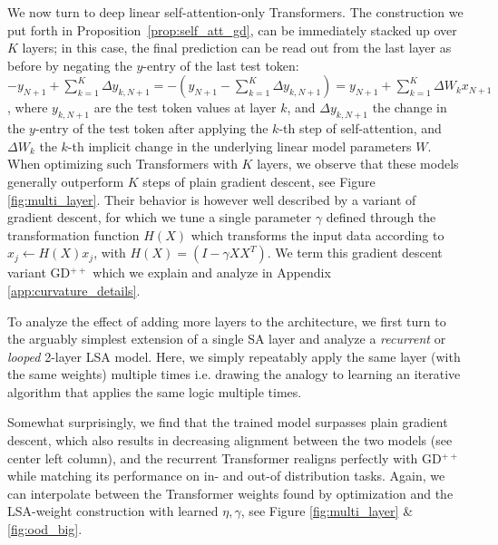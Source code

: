 \documentclass{article}
\theoremstyle{plain}
\theoremstyle{definition}
\theoremstyle{remark}
\begin{document}
We now turn to deep linear self-attention-only Transformers. The construction we put forth in Proposition~\ref{prop:self_att_gd}, can be immediately stacked up over $K$ layers; in this case, the final prediction can be read out from the last layer as before by negating the $y$-entry of the last test token: $-y_{N+1} + \sum_{k=1}^K \Delta y_{k,N+1}= - (y_{N+1} - \sum_{k=1}^K \Delta y_{k,N+1}) = y_{N+1} + \sum_{k=1}^K \Delta W_k x_{N+1}$, where $y_{k,N+1}$ are the test token values at layer $k$, and $\Delta y_{k,N+1}$ the change in the $y$-entry of the test token after applying the $k$-th step of self-attention, and $\Delta W_k$ the $k$-th implicit change in the underlying linear model parameters $W$. When optimizing such Transformers with $K$ layers, we observe that these models generally outperform $K$ steps of plain gradient descent, see Figure \ref{fig:multi_layer}. Their behavior is however well described by a variant of gradient descent, for which we tune a single parameter $\gamma$ defined through  the transformation function $H(X)$ which transforms the input data according to $x_j \leftarrow H(X) x_j$, with $H(X) = (I - \gamma XX^T)$. We term this gradient descent variant GD$^{++}$ which we explain and analyze in Appendix \ref{app:curvature_details}.

To analyze the effect of adding more layers to the architecture, we first turn to the arguably simplest extension of a single SA layer and analyze a \textit{recurrent} or \textit{looped} 2-layer LSA model. Here, we simply repeatably apply the same layer (with the same weights) multiple times i.e. drawing the analogy to learning an iterative algorithm that applies the same logic multiple times. 

Somewhat surprisingly, we find that the trained model surpasses plain gradient descent, which also results in decreasing alignment between the two models (see center left column), and the recurrent Transformer realigns perfectly with GD$^{++}$ while matching its performance on in- and out-of distribution tasks. Again, we can interpolate between the Transformer weights found by optimization and the LSA-weight construction with learned $\eta, \gamma$, see Figure \ref{fig:multi_layer} \& \ref{fig:ood_big}.
\end{document}
